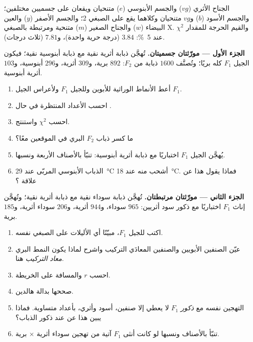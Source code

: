 \begin{problem}
\label{pb:b2:meiosis-heredity:1}
الجناح الأثري ($vg$) والجسم الأبنوسي ($e$) متنحيان ويقعان على
جسميين مختلفين؛ والجسم الأسود ($b$) و$vg$ متنحيان وكلاهما
يقع على الصبغي 2؛ والجسم الأصفر ($y$) والعين البيضاء ($w$) والجناح
الصغير ($m$) متنحية ومرتبطة بالصبغي X. والقيم الحرجة للمقدار $\chi^2$ عند
\qty{5}{\%}: $3.84$ (درجة حرية واحدة)، و$7.81$ (ثلاث درجات).

\medskip
\noindent\textbf{الجزء الأول --- مورّثتان جسميتان.}
تُهجَّن ذبابة أثرية نقية مع ذبابة أبنوسية نقية؛ فيكون الجيل $F_1$
كله بريًا؛ وتُصنَّف $1600$ ذبابة من $F_2$: $892$ برية، و$309$
أثرية، و$296$ أبنوسية، و$103$ أثرية أبنوسية.
\begin{enumerate}
  \item أعط الأنماط الوراثية للأبوين وللجيل $F_1$ ولأعراس
        الجيل $F_1$.
  \item احسب الأعداد المنتظرة في حال .
  \item احسب $\chi^2$ واستنتج.
  \item ما كسر ذباب $F_2$ البري  في الموقعين معًا؟
  \item يُهجَّن الجيل $F_1$ اختباريًا مع ذبابة أثرية أبنوسية:
        تنبّأ بالأصناف الأربعة ونسبها.
  \item الذباب الأبنوسي المربّى عند \qty{29}{\celsius} أشحب منه عند
        \qty{18}{\celsius}. فماذا يقول هذا عن علاقة 
        ؟
\end{enumerate}

\medskip
\noindent\textbf{الجزء الثاني --- مورّثتان مرتبطتان.}
تُهجَّن ذبابة سوداء نقية مع ذبابة أثرية نقية؛ وتُهجَّن إناث $F_1$
اختباريًا مع ذكور سود أثريين: $965$ سوداء،
و$944$ أثرية، و$206$ سوداء أثرية، و$185$ برية.
\begin{enumerate}[resume]
  \item اكتب  للجيل $F_1$، مبيّنًا أي الأليلات على
        الصبغي نفسه.
  \item عيّن الصنفين الأبويين والصنفين المعادَي التركيب واشرح
        لماذا يكون النمط البري \emph{معاد التركيب} هنا.
  \item احسب $r$ والمسافة على الخريطة.
  \item صححها بدالة هالدين.
  \item التهجين نفسه مع \emph{ذكور} $F_1$ لا يعطي إلا صنفين، أسود
        وأثري، بأعداد متساوية. فماذا يبين هذا عن  عند
        ذكور الذباب؟
  \item تنبّأ بالأصناف ونسبها لو كانت أنثى $F_1$ آتية من تهجين
        سوداء أثرية $\times$ برية.
\end{enumerate}


\end{problem}
